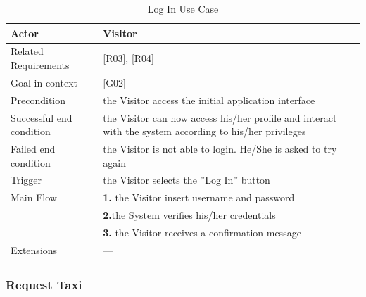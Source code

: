 \begin{table}[htbp]
\begin{center}
\begin{tabular}[t]{p{}p{}}

\hline
Actor & Visitor \\
\hline
Related Requirements & [R03], [R04] \\
\hline
Goal in context & [G02] \\
\hline
Precondition & the Visitor access the initial application interface \\
\hline
Successful end condition & 
the Visitor can now access his/her profile and interact with the system according to his/her privileges
 \\
\hline
Failed end condition & the Visitor is not able to login. He/She is asked to try again \\
\hline
Trigger & the Visitor selects the ''Log In'' button \\
\hline
Main Flow & \textbf{1.} the Visitor insert username and password \\
& \textbf{2.}the System verifies his/her credentials \\
& \textbf{3.} the Visitor receives a confirmation message \\
\hline
Extensions & --- \\
\hline

\end{tabular}
\end{center}
\caption{Log In Use Case}
\end{table}
\clearpage

\subsubsection{Request Taxi}

